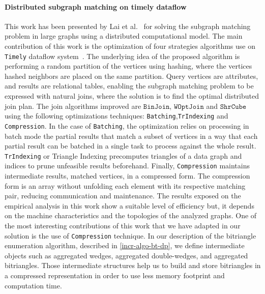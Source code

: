 \paragraph{Distributed subgraph matching on timely dataflow} This work has been presented by Lai et al.~\cite{Lai} for solving the subgraph matching problem in large graphs using a distributed computational model.
The main contribution of this work is the optimization of four strategies algorithms use on \texttt{Timely} dataflow system~\cite{timelyflow}. 
The underlying idea of the proposed algorithm is performing a random partition of the vertices using hashing, where the vertices hashed neighbors are placed on the same partition.
Query vertices are attributes, and results are relational tables, enabling the subgraph matching problem to be expressed with natural joins, where the solution is to find the optimal distributed join plan.
The join algorithms improved are $\mathtt{BinJoin}$, $\mathtt{WOptJoin}$ and $\mathtt{ShrCube}$ using the following optimizations techniques: \texttt{Batching},\texttt{TrIndexing} and \texttt{Compression}.
In the case of \texttt{Batching}, the optimization relies on processing in batch mode the partial results that match a subset of vertices in a way that each partial result can be batched in a single task to process against the whole result.
\texttt{TrIndexing} or Triangle Indexing precomputes triangles of a data graph and indices to prune unfeasible results beforehand. 
Finally, \texttt{Compression} maintains intermediate results, matched vertices, in a compressed form. The compression form is an array without unfolding each element with its respective matching pair, reducing communication and maintenance.
The results exposed on the empirical analysis in this work show a suitable level of efficiency but, it depends on the machine characteristics and the topologies of the analyzed graphs. 
One of the most interesting contributions of this work that we have adapted in our solution is the use of \texttt{Compression} technique. 
In our description of the bitriangle enumeration algorithm, described in \autoref{incr-algo-bt-dp}, we define intermediate objects such as aggregated wedges, aggregated double-wedges, and aggregated bitriangles. 
Those intermediate structures help us to build and store bitriangles in a compressed representation in order to use less memory footprint and computation time.

